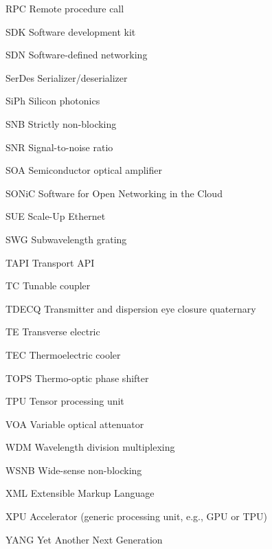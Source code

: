\begin{list}{}
	\item[RPC] Remote procedure call
	\item[SDK] Software development kit
	\item[SDN] Software-defined networking
	\item[SerDes] Serializer/deserializer
	\item[SiPh] Silicon photonics
	\item[SNB] Strictly non-blocking
	\item[SNR] Signal-to-noise ratio
	\item[SOA] Semiconductor optical amplifier
	\item[SONiC] Software for Open Networking in the Cloud
	\item[SUE] Scale-Up Ethernet
	\item[SWG] Subwavelength grating
	\item[TAPI] Transport API
	\item[TC] Tunable coupler
	\item[TDECQ] Transmitter and dispersion eye closure quaternary
	\item[TE] Transverse electric
	\item[TEC] Thermoelectric cooler
	\item[TOPS] Thermo-optic phase shifter
	\item[TPU] Tensor processing unit
	\item[VOA] Variable optical attenuator
	\item[WDM] Wavelength division multiplexing
	\item[WSNB] Wide-sense non-blocking
	\item[XML] Extensible Markup Language
	\item[XPU] Accelerator (generic processing unit, e.g., GPU or TPU)
	\item[YANG] Yet Another Next Generation
\end{list}
